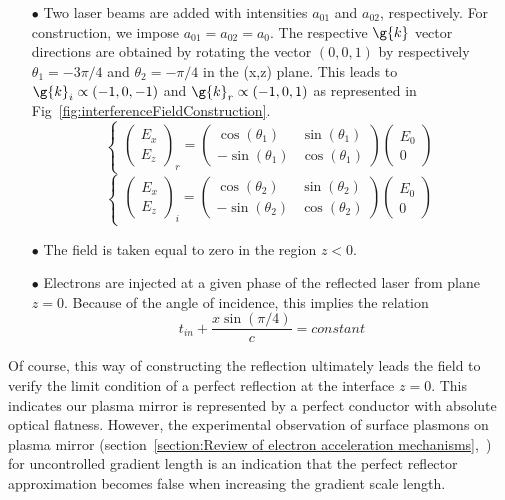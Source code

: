 \begin{itemize}
\item[$\bullet$] Two laser beams are added with intensities $a_{01}$ and $a_{02}$, respectively. For construction, we impose $a_{01} = a_{02} = a_0$. The respective $\g{k}$ vector directions are obtained by rotating the vector $(0,0,1)$ by respectively $\theta_1 = -3\pi/4$ and $\theta_2 =-\pi/4$ in the (x,z) plane. This leads to $\g{k}_i \propto (-1,0,-1)$ and $\g{k}_r \propto (-1,0,1)$ as represented in Fig~\ref{fig:interferenceFieldConstruction}.
\begin{equation}
  \left\{
      \begin{aligned}
      \left( \begin{array}{c}
E_{x} \\
E_{z}  \end{array} \right)_r= 
 \left( \begin{array}{cc}
\cos (\theta_1) & \sin(\theta_1)\\
-\sin(\theta_1) &  \cos (\theta_1)   \end{array} \right) \left( \begin{array}{c}
E_0 \\
0  \end{array} \right)
      \end{aligned}
    \right.
\end{equation}
\begin{equation}
  \left\{
      \begin{aligned}
      \left( \begin{array}{c}
E_{x} \\
E_{z}  \end{array} \right)_i= 
 \left( \begin{array}{cc}
\cos (\theta_2) & \sin(\theta_2)\\
-\sin(\theta_2) &  \cos (\theta_2)   \end{array} \right) \left( \begin{array}{c}
E_0 \\
0  \end{array} \right)
      \end{aligned}
    \right.
\end{equation}


\item[$\bullet$]  The field is taken equal to zero in the region $z<0$.
\item[$\bullet$]  Electrons are injected at a given phase of the reflected laser from plane $z=0$. Because of the angle of incidence, this implies the relation 
$$
t_{in} + \frac{x\sin(\pi/4)}{c} = constant
$$
\end{itemize}
Of course, this way of constructing the reflection ultimately leads the field to verify the limit condition of a perfect reflection at the interface $z=0$. This indicates our plasma mirror is represented by a perfect conductor with absolute optical flatness. 
However, the experimental observation of surface plasmons on plasma mirror (section~\ref{section:Review of electron acceleration mechanisms},~\cite{fedeli2015electron}) for uncontrolled gradient length is an indication that the perfect reflector approximation becomes false when increasing the gradient scale length. 


